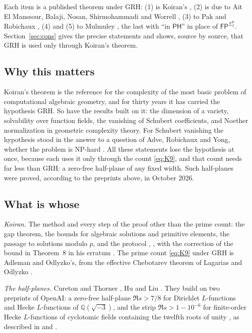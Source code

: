 \documentclass[11pt]{amsart}
\theoremstyle{definition}
\theoremstyle{remark}
\newcommand{\Q}{\mathbb Q}
\newcommand{\cl}[1]{\mathsf{#1}}
\newcommand{\Sigtwo}{\Sigma_2^{\cl P}}
\begin{document}
Each item is a published theorem under GRH: (1) is Koiran's \cite[Theorem~4.1]{K97}, (2) is due to Ait El Manssour, Balaji, Nosan, Shirmohammadi and Worrell \cite[Theorem~1]{A24}, (3) to Pak and Robichaux \cite[Theorems~1.1 and~3.4, Corollary~1.4]{PR25}, (4) and (5) to Mulmuley \cite[Theorems~2.10 and~3.4]{M17}, the last with ``in $\cl{PH}$'' in place of $\cl{FP}^{\Sigtwo}$. Section~\ref{sec:cons} gives the precise statements and shows, source by source, that GRH is used only through Koiran's theorem.

\subsection{Why this matters}
Koiran's theorem is the reference for the complexity of the most basic problem of computational algebraic geometry, and for thirty years it has carried the hypothesis GRH. So have the results built on it: the dimension of a variety, solvability over function fields, the vanishing of Schubert coefficients, and Noether normalization in geometric complexity theory. For Schubert vanishing the hypothesis stood in the answer to a question of Adve, Robichaux and Yong, whether the problem is NP-hard \cite[Question~1.2 and Corollary~1.4]{PR25}. All these statements lose the hypothesis at once, because each uses it only through the count \eqref{eq:K9}, and that count needs far less than GRH: a zero-free half-plane of any fixed width. Such half-planes were proved, according to the preprints above, in October 2026.

\subsection{What is whose}
\emph{Koiran.} The method and every step of the proof other than the prime count: the gap theorem, the bounds for algebraic solutions and primitive elements, the passage to solutions modulo $p$, and the protocol \cite[Theorems~1, 2, 4, 5, 7, 8, Lemma~3, Corollary~1]{K96}, \cite[Theorem~2]{K96b}, with the correction of the bound in Theorem~8 in his erratum \cite{K97e}. The prime count \eqref{eq:K9} under GRH is Adleman and Odlyzko's, from the effective Chebotarev theorem of Lagarias and Odlyzko \cite{LO}.

\emph{The half-planes.} Cureton and Thorner \cite{CT}, Hu \cite{Hu} and Liu \cite{Liu}. They build on two preprints of OpenAI: a zero-free half-plane $\Re s>7/8$ for Dirichlet $L$-functions and Hecke $L$-functions of $\Q(\sqrt{-3})$, and the strip $\Re s>1-10^{-6}$ for finite-order Hecke $L$-functions of cyclotomic fields containing the twelfth roots of unity \cite[Theorem~1.2]{OAI}, as described in \cite[pp.~2--3]{CT} and \cite[p.~2]{Hu}.
\end{document}
